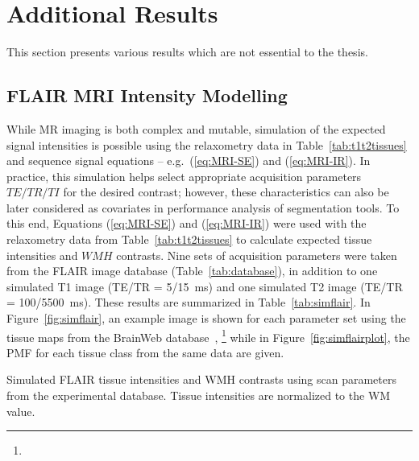 \chapter{Additional Results}
This section presents various results which are not essential to the thesis.
\section{FLAIR MRI Intensity Modelling}\label{s:simflair}
While MR imaging is both complex and mutable,
simulation of the expected signal intensities is possible
using the relaxometry data in Table~\ref{tab:t1t2tissues} and
sequence signal equations -- e.g.\ (\ref{eq:MRI-SE}) and (\ref{eq:MRI-IR}).
In practice, this simulation helps select appropriate acquisition parameters $TE/TR/TI$
for the desired contrast;
however, these characteristics can also be later considered
as covariates in performance analysis of segmentation tools.
To this end, Equations (\ref{eq:MRI-SE}) and (\ref{eq:MRI-IR})
were used with the relaxometry data from Table~\ref{tab:t1t2tissues}
to calculate expected tissue intensities and $WMH$ contrasts.
Nine sets of acquisition parameters were taken from
the FLAIR image database (Table~\ref{tab:database}),
in addition to one simulated T1 image (TE/TR = \qty[parse-numbers=false]{5/15}{\milli\second})
and one simulated T2 image (TE/TR = \qty[parse-numbers=false]{100/5500}{\milli\second}).
These results are summarized in Table~\ref{tab:simflair}.
In Figure~\ref{fig:simflair}, an example image is shown for each parameter set
using the tissue maps from the BrainWeb database~\cite{Collins1998},%
\footnote{}
while in Figure~\ref{fig:simflairplot},
the PMF for each tissue class from the same data are given.
\begin{table}
  \centering
  \caption{Simulated FLAIR tissue intensities and WMH contrasts
    using scan parameters from the experimental database.
    Tissue intensities are normalized to the WM value.}%
  \label{tab:simflair}
  
\end{table}
